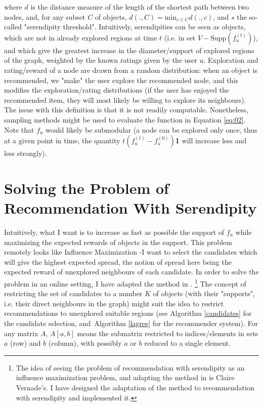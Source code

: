 \documentclass{article}
\begin{document}
where $d$ is the distance measure of the length of the shortest path between two nodes, and, for any subset $C$ of objects, $d(., C) = \text{min}_{c \in C} d(., c)$, and $s$ the so-called "serendipity threshold". Intuitively, serendipities can be seen as objects, which are not in already explored regions at time $t$ (i.e. in set $V - \text{Supp}(f^{(t)}_{u})$), and which give the greatest increase in the diameter/support of explored regions of the graph, weighted by the known ratings given by the user $u$. Exploration and rating/reward of a node are drawn from a random distribution: when an object is recommended, we "make" the user explore the recommended node, and this modifies the exploration/rating distributions (if the user has enjoyed the recommended item, they will most likely be willing to explore its neighbours). The issue with this definition is that it is not readily computable. Nonetheless, sampling methods might be used to evaluate the function in Equation \ref{eq:02}. Note that $f_u$ would likely be submodular (a node can be explored only once, thus at a given point in time, the quantity $t(f^{(t)}_{u}-f^{(0)}_{u})$\textbf{1} will increase less and less strongly).

\section{Solving the Problem of Recommendation With Serendipity}

Intuitively, what I want is to increase as fast as possible the support of $f_{u}$ while maximizing the expected rewards of objects in the support. This problem remotely looks like Influence Maximization -I want to select the candidates which will give the highest expected spread, the notion of spread here being the expected reward of unexplored neighbours of each candidate. In order to solve the problem in an online setting, I have adapted the method in \cite{lagree2017effective}. \footnote{The idea of seeing the problem of recommendation with serendipity as an influence maximization problem, and adapting the method in \cite{lagree2017effective} is Claire Vernade's. I have designed the adaptation of the method to recommendation with serendipity and implemented it.} The concept of restricting the set of candidates to a number $K$ of objects (with their "supports", i.e. their direct neighbours in the graph) might suit the idea to restrict recommendations to unexplored suitable regions (see Algorithm \ref{candidates} for the candidate selection, and Algorithm \ref{lagree} for the recommender system). For any matrix $A$, $A[a, b]$ means the submatrix restricted to indices/elements in sets $a$ (row) and $b$ (column), with possibly $a$ or $b$ reduced to a single element.
\end{document}
